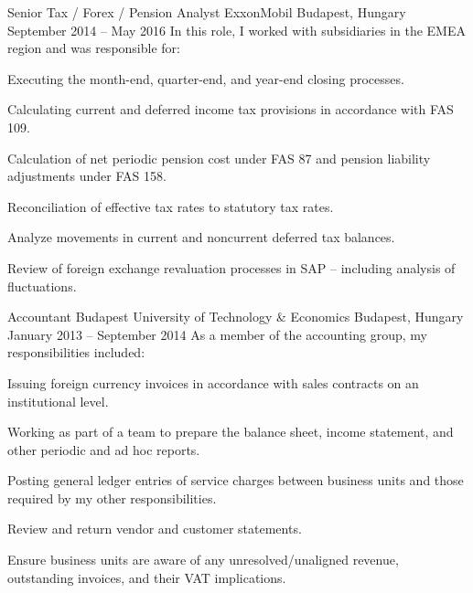 \begin{cventries}

  \cventry
    {Senior Tax / Forex / Pension Analyst} %
    {ExxonMobil} %
    {Budapest, Hungary} %
    {September 2014 -- May 2016} %
    {In this role, I worked with subsidiaries in the EMEA region and was responsible for:} %
    {
      \begin{cvitems} %
        \item {Executing the month-end, quarter-end, and year-end closing processes.}
        \item {Calculating current and deferred income tax provisions in accordance with FAS 109.}
        \item {Calculation of net periodic pension cost under FAS 87 and pension liability adjustments under FAS 158.}
        \item {Reconciliation of effective tax rates to statutory tax rates.}
        \item {Analyze movements in current and noncurrent deferred tax balances.}
        \item {Review of foreign exchange revaluation processes in SAP -- including analysis of fluctuations.}
      \end{cvitems}
    }


  \cventry
    {Accountant} %
    {Budapest University of Technology \& Economics} %
    {Budapest, Hungary} %
    {January 2013 -- September 2014} %
    {As a member of the accounting group, my responsibilities included:} %
    {
      \begin{cvitems} %
        \item {Issuing foreign currency invoices in accordance with sales contracts on an institutional level.}
        \item {Working as part of a team to prepare the balance sheet, income statement, and other periodic and ad hoc reports.}
        \item {Posting general ledger entries of service charges between business units and those required by my other responsibilities.}
        \item {Review and return vendor and customer statements.}
        \item {Ensure business units are aware of any unresolved/unaligned revenue, outstanding invoices, and their VAT implications.}
      \end{cvitems}
    }


\end{cventries}
